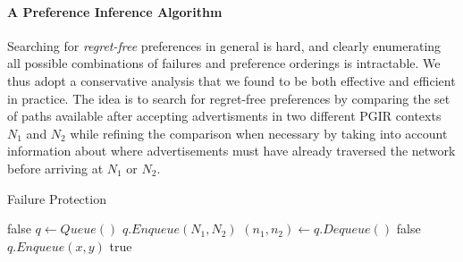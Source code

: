 \documentclass[10pt]{sigalternate052015}
\newcommand{\para}[1]{\paragraph*{\textbf{#1}}}
\begin{document}
\para{A Preference Inference Algorithm}


Searching for \emph{regret-free} preferences in general is hard, and clearly enumerating all possible combinations of failures and preference orderings is intractable. We thus adopt a conservative analysis that we found to be both effective and efficient in practice. The idea is to search for regret-free preferences by comparing the set of paths available after accepting advertisments in two different PGIR contexts $N_1$ and $N_2$ while refining the comparison when necessary by taking into account information about where advertisements must have already traversed the network before arriving at $N_1$ or $N_2$.

\begin{algorithm}[t!]
\caption{Failure Protection}
\label{alg:failures}
\begin{algorithmic}[1]
   \Return false
  \EndIf
  \State $q \gets Queue()$
  \State $q.Enqueue (N_1, N_2)$
    \State $(n_1,n_2) \gets q.Dequeue()$
      \Return false
    \EndIf
          \State $q.Enqueue(x,y)$
        \EndIf
      \EndIf
    \EndFor
  \EndWhile
  \Return true
  \EndProcedure
\end{algorithmic}
\end{algorithm}
\end{document}
